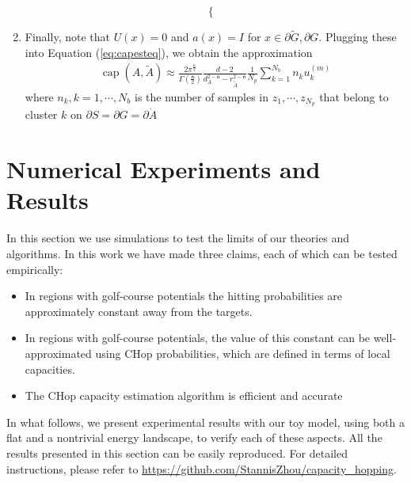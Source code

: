 \documentclass[english, aip, jcp, priprint, graphicx,floatfix]{revtex4-1}
\theoremstyle{plain}
\theoremstyle{definition}
\theoremstyle{plain}
\newcommand{\dimension}{{\mathfrak{n}}}
\begin{document}
\begin{enumerate}
\[\begin{cases}
\end{cases}
\]
\item Finally, note that $U (x) = 0$ and $a (x) = I$ for $x
\in \partial \tilde{G},\partial G$.  Plugging these into Equation (\ref{eq:capesteq}), we obtain the approximation
%
\begin{gather}
	\ensuremath{\operatorname{cap}} (A, \tilde{A}) \approx \frac{2\pi^{\frac{\dimension}{2}}}{\Gamma(\frac{\dimension}{2})}\frac{d-2}{d_A^{2-\dimension}-r_{\tilde A}^{2-\dimension}}\frac{1}{N_p} \sum_{k=1}^{N_b}n_k u_k^{(m)}
\end{gather}
where $n_k, k=1, \cdots, N_b$ is the number of samples in $z_1, \cdots, z_{N_p}$ that belong to cluster $k$ on $\partial S=\partial G=\partial \dot{A}$
%
\end{enumerate}


                                     


\section{Numerical Experiments and Results}\label{sec:experiments}
In this section we use simulations to test the limits of our theories and algorithms.  In this work we have made three claims, each of which can be tested empirically:

\begin{itemize}
\item In regions with golf-course potentials the hitting probabilities are approximately constant away from the targets.
\item In regions with golf-course potentials, the value of this constant can be well-approximated using CHop probabilities, which are defined in terms of local capacities.
\item The CHop capacity estimation algorithm is efficient and accurate
\end{itemize}

In what follows, we present experimental results with our toy model, using both a flat and a nontrivial energy landscape, to verify each of these aspects.  All the results presented in this section can be easily reproduced. For detailed instructions, please refer to \url{https://github.com/StannisZhou/capacity_hopping}.
\end{document}
